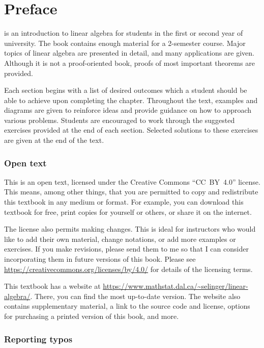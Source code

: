 \chapter*{Preface}

\textit{\bookfulltitle} is an introduction to linear algebra for
students in the first or second year of university. The book contains
enough material for a 2-semester course. Major topics of linear
algebra are presented in detail, and many applications are
given. Although it is not a proof-oriented book, proofs of most
important theorems are provided. 

Each section begins with a list of desired outcomes which a student
should be able to achieve upon completing the chapter.  Throughout the
text, examples and diagrams are given to reinforce ideas and provide
guidance on how to approach various problems. Students are encouraged
to work through the suggested exercises provided at the end of each
section. Selected solutions to these exercises are given at the end of
the text.

\subsection*{Open text}

This is an open text, licensed under the Creative Commons
``CC~BY~4.0'' license. This means, among other things, that you are
permitted to copy and redistribute this textbook in any medium or
format. For example, you can download this textbook for free, print
copies for yourself or others, or share it on the internet.

The license also permits making changes. This is ideal for instructors
who would like to add their own material, change notations, or add
more examples or exercises. If you make revisions, please send them to
me so that I can consider incorporating them in future versions of
this book. Please see
\url{https://creativecommons.org/licenses/by/4.0/} for details of the
licensing terms.

This textbook has a website at
\url{https://www.mathstat.dal.ca/~selinger/linear-algebra/}.  There,
you can find the most up-to-date version. The website also contains
supplementary material, a link to the source code and license, options
for purchasing a printed version of this book, and more.

\subsection*{Reporting typos}

